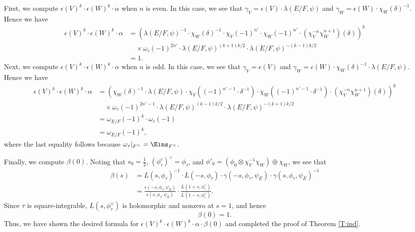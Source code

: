 \documentclass[11pt]{amsart}
\numberwithin{equation}{section}
\theoremstyle{plain}
\theoremstyle{definition}
\theoremstyle{remark}
\def\1{\Eins}
\begin{document}
First, we compute $\epsilon(V)^k \cdot \epsilon(W)^k \cdot \alpha$ when $n$ is even.
In this case, we see that $\gamma_V = \epsilon(V) \cdot \lambda(E/F, \psi)$ and $\gamma_W = \epsilon(W) \cdot \chi_W(\delta)^{-1}$.
Hence we have
\begin{align*}
 \epsilon(V)^k \cdot \epsilon(W)^k \cdot \alpha
 & = ( \lambda(E/F, \psi)^{-1} \cdot \chi_W(\delta)^{-1}
 \cdot \chi_V(-1)^{n'} \cdot \chi_W(-1)^{n'}
 \cdot (\chi_V^{-n} \chi_W^{n+1})(\delta))^k \\
 & \quad \times \omega_{\tau}(-1)^{2n'} \cdot
 \lambda(E/F, \psi)^{(k+1)k/2} \cdot \lambda(E/F, \psi)^{-(k-1)k/2} \\
 & = 1.
\end{align*}
Next, we compute $\epsilon(V)^k \cdot \epsilon(W)^k \cdot \alpha$ when $n$ is odd.
In this case, we see that $\gamma_V = \epsilon(V)$ and $\gamma_W = \epsilon(W) \cdot \chi_W(\delta)^{-1} \cdot \lambda(E/F, \psi)$.
Hence we have
\begin{align*}
 \epsilon(V)^k \cdot \epsilon(W)^k \cdot \alpha
 & = ( \chi_W(\delta)^{-1} \cdot \lambda(E/F, \psi)
 \cdot \chi_V((-1)^{n'-1} \cdot \delta^{-1})
 \cdot \chi_W((-1)^{n'-1} \cdot \delta^{-1})
 \cdot (\chi_V^{-n} \chi_W^{n+1})(\delta))^k \\
 & \quad \times \omega_{\tau}(-1)^{2n'-1} \cdot \lambda(E/F, \psi)^{(k-1)k/2} \cdot \lambda(E/F, \psi)^{-(k+1)k/2} \\
 & = \omega_{E/F}(-1)^k \cdot \omega_\tau(-1) \\
 & = \omega_{E/F}(-1)^k,
\end{align*}
where the last equality follows because $\omega_\tau|_{F^{\times}} = \1_{F^{\times}}$.

Finally, we compute $\beta(0)$.
Noting that $s_0 = \frac{1}{2}$, $(\phi_\tau^c)^\vee = \phi_\tau$, and $\phi'_0 = (\phi_0 \otimes \chi_V^{-1} \chi_W) \oplus \chi_W$, we see that
\begin{align*}
 \beta(s) & = L(s, \phi_\tau)^{-1}
 \cdot L(-s, \phi_\tau) \cdot \gamma(-s, \phi_\tau, \psi_E) \cdot \gamma(s, \phi_{\tau}, \psi_E)^{-1} \\
 & = \frac{\epsilon(-s, \phi_\tau, \psi_E)}{\epsilon(s, \phi_\tau, \psi_E)}
 \cdot \frac{L(1+s, \phi_\tau^\vee)}{L(1-s, \phi_\tau^\vee)}.
\end{align*}
Since $\tau$ is square-integrable, $L(s, \phi_\tau^\vee)$ is holomorphic and nonzero at $s=1$, and hence
\[
 \beta(0) = 1.
\]
Thus, we have shown the desired formula for $\epsilon(V)^k \cdot \epsilon(W)^k \cdot \alpha \cdot \beta(0)$ and completed the proof of Theorem \ref{T:ind}.
\end{document}
